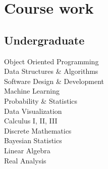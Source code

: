 \documentclass[letterpaper]{deedy-resume}
\begin{document}
\begin{minipage}[t]{0.31\textwidth}
\section{Course work}
\subsection{Undergraduate}
Object Oriented Programming \\
Data Structures \& Algorithms \\
Software Design \& Development \\
Machine Learning \\
Probability \& Statistics \\
Data Visualization \\
Calculus I, II, III \\
Discrete Mathematics \\
Bayesian Statistics \\
Linear Algebra \\
Real Analysis
\sectionspace 

\end{minipage} 
\hfill
%
%
\end{document}

